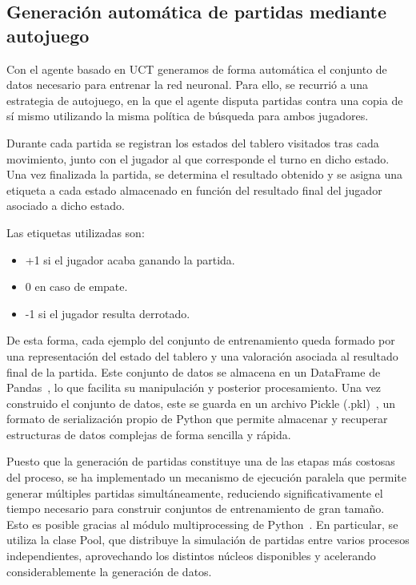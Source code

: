 \documentclass[conference,a4paper]{IEEEtran}
\begin{document}
\subsection{Generación automática de partidas mediante autojuego} 
Con el agente basado en UCT generamos de forma automática el conjunto de datos necesario para entrenar la red neuronal. 
Para ello, se recurrió a una estrategia de autojuego, en la que el agente disputa partidas contra una copia de sí mismo utilizando la misma política de búsqueda para ambos jugadores. 

Durante cada partida se registran los estados del tablero visitados tras cada movimiento, junto con el jugador al que corresponde el turno en dicho estado. 
Una vez finalizada la partida, se determina el resultado obtenido y se asigna una etiqueta a cada estado almacenado en función del resultado final del jugador asociado a dicho estado. 

Las etiquetas utilizadas son: 
\begin{itemize}
\item +1 si el jugador acaba ganando la partida. 
\item 0 en caso de empate. 
\item -1 si el jugador resulta derrotado. 
\end{itemize}

De esta forma, cada ejemplo del conjunto de entrenamiento queda formado por una representación del estado del tablero y una valoración asociada al resultado final de la partida. 
Este conjunto de datos se almacena en un DataFrame de Pandas~\cite{b9}, lo que facilita su manipulación y posterior procesamiento. 
Una vez construido el conjunto de datos, este se guarda en un archivo Pickle (.pkl)~\cite{b10}, un formato de serialización propio de Python que permite almacenar y recuperar estructuras de datos complejas de forma sencilla y rápida. 

Puesto que la generación de partidas constituye una de las etapas más costosas del proceso, se ha implementado un mecanismo de ejecución paralela que permite generar múltiples partidas simultáneamente, reduciendo significativamente el tiempo necesario para construir conjuntos de entrenamiento de gran tamaño. 
Esto es posible gracias al módulo multiprocessing de Python~\cite{b11}. 
En particular, se utiliza la clase Pool, que distribuye la simulación de partidas entre varios procesos independientes, aprovechando los distintos núcleos disponibles y acelerando considerablemente la generación de datos. 
\end{document}
